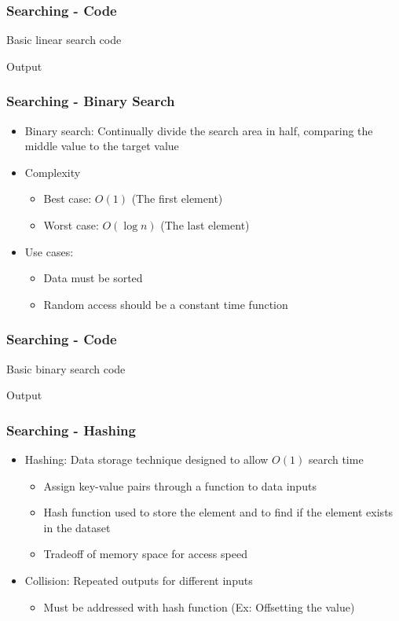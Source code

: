 \documentclass[c, aspectratio=169]{beamer}
\begin{document}
\begin{frame}\frametitle{Searching - Code}
Basic linear search code


Output

\end{frame}

\begin{frame}\frametitle{Searching - Binary Search}
\begin{itemize}
\item Binary search: Continually divide the search area in half, comparing the middle value to the target value
\item Complexity
	\begin{itemize}
	\item Best case: $O(1)$ (The first element)
	\item Worst case: $O(\log n)$ (The last element)
	\end{itemize}
\item Use cases:
	\begin{itemize}
	\item Data must be sorted
	\item Random access should be a constant time function
	\end{itemize}
\end{itemize}
\end{frame}

\begin{frame}\frametitle{Searching - Code}
Basic binary search code


Output

\end{frame}

\begin{frame}\frametitle{Searching - Hashing}
\begin{itemize}
\item Hashing: Data storage technique designed to allow $O(1)$ search time
	\begin{itemize}
	\item Assign key-value pairs through a function to data inputs
	\item Hash function used to store the element and to find if the element exists in the dataset
	\item Tradeoff of memory space for access speed
	\end{itemize}
\item Collision: Repeated outputs for different inputs
	\begin{itemize}
	\item Must be addressed with hash function (Ex: Offsetting the value)
	\end{itemize}
\end{itemize}
\end{frame}
\end{document}
